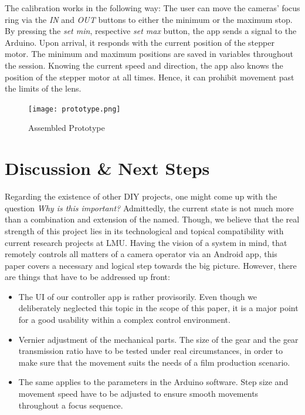 \documentclass{sigchi}
\begin{document}
The calibration works in the following way: The user can move the cameras' focus ring via the \textit{IN} and \textit{OUT} buttons to either the minimum or the maximum stop. By pressing the \textit{set min}, respective \textit{set max} button, the app sends a signal to the Arduino. Upon arrival, it responds with the current position of the stepper motor. The minimum and maximum positions are saved in variables throughout the session. Knowing the current speed and direction, the app also knows the position of the stepper motor at all times. Hence, it can prohibit movement past the limits of the lens.

\begin{figure}
  \center
  \texttt{[image: prototype.png]}
  \caption{Assembled Prototype}
  \label{fig:prototype}
\end{figure} 

\section{Discussion \& Next Steps}

Regarding the existence of other DIY projects, one might come up with the question \textit{Why is this important?} Admittedly, the current state is not much more than a combination and extension of the named. Though, we believe that the real strength of this project lies in its technological and topical compatibility with current research projects at LMU. Having the vision of a system in mind, that remotely controls all matters of a camera operator via an Android app, this paper covers a necessary and logical step towards the big picture. 
However, there are things that have to be addressed up front: 
\begin{itemize}
  \item The UI of our controller app is rather provisorily. Even though we deliberately neglected this topic in the scope of this paper, it is a major point for a good usability within a complex control environment.
  \item Vernier adjustment of the mechanical parts. The size of the gear and the gear transmission ratio have to be tested under real circumstances, in order to make sure that the movement suits the needs of a film production scenario.
  \item The same applies to the parameters in the Arduino software. Step size and movement speed have to be adjusted to ensure smooth movements throughout a focus sequence.
\end{itemize}
\end{document}
